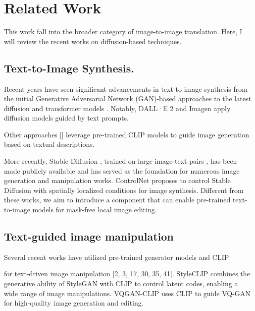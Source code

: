 \section{Related Work}\label{zero-shot-RW}
This work fall into the broader category of image-to-image translation. Here, I will review the recent works on diffusion-based techniques.

\subsection{Text-to-Image Synthesis.}

Recent years have seen significant advancements in text-to-image synthesis from the initial Generative Adversarial Network (GAN)-based approaches \cite{li2020manigan,xu2018attngan, zhang2017stackgan, zhang2018stackgan++} to the latest diffusion \cite{gu2022vector, ho2020denoising,nichol2021improved,ramesh2022hierarchical, rombach2022high, saharia2022photorealistic,song2020denoising,zhang2023adding} and transformer models \cite{ding2022cogview2, esser2021taming, ramesh2021zero, yu2022scaling}. Notably, DALL·E 2 \cite{ramesh2022hierarchical} and Imagen \cite{ho2022imagen} apply diffusion models guided by text prompts. 



 Other approaches [\cite{crowson2022vqgan, ramesh2022hierarchical}] leverage pre-trained CLIP models \cite{radford2021learning} to guide image generation based on textual descriptions. 
 
 More recently, Stable Diffusion \cite{rombach2022high}, trained on large image-text pairs \cite{schuhmann2021laion}, has been made publicly available and has served as the foundation for numerous image generation and manipulation works. ControlNet \cite{zhang2023adding} proposes to control Stable Diffusion with spatially localized conditions for image synthesis. Different from these works, we aim to introduce a component that can enable pre-trained text-to-image models for mask-free local image editing.

\subsection{Text-guided image manipulation}
Several recent works
have utilized pre-trained generator models and CLIP \cite{radford2021learning} 

for text-driven image manipulation \cite{bar2022text2live, gal2022stylegan,kwon2022clipstyler, liu2021fusedream, patashnik2021styleclip} [2, 3, 17, 30, 35, 41].
StyleCLIP \cite{patashnik2021styleclip} combines the generative ability of StyleGAN \cite{karras2020analyzing} with CLIP to control latent codes, enabling a
wide range of image manipulations. VQGAN-CLIP \cite{crowson2022vqgan}
uses CLIP \cite{radford2021learning} to guide VQ-GAN \cite{esser2021taming} for high-quality image generation and editing.

